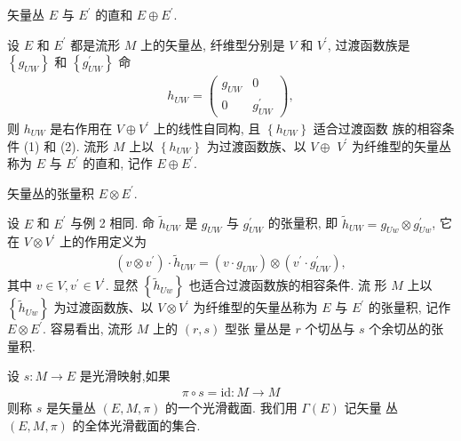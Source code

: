     \begin{example}[][例 2]
        矢量丛 $E$ 与 $E^{\prime}$ 的直和 $E \oplus E^{\prime}$.
    \end{example}
    \begin{solution}
        设 $E$ 和 $E^{\prime}$ 都是流形 $M$ 上的矢量丛, 纤维型分别是 $V$ 和 $V^{\prime}$, 过渡函数族是 $\left\{g_{UW}\right\}$ 和 $\left\{g_{U W}^{\prime}\right\}$ 命
        \begin{align*}
        h_{U W}=\left(\begin{array}{cc}
        g_{U W} & 0 \\
        0 & g_{U W}^{\prime}
        \end{array}\right),
        \end{align*}
        则 $h_{U W}$ 是右作用在 $V \oplus V^{\prime}$ 上的线性自同构, 且 $\left\{h_{U W}\right\}$ 适合过渡函数 族的相容条件 (1) 和 (2). 流形 $M$ 上以 $\left\{h_{U W}\right\}$ 为过渡函数族、以 $V \oplus$ $V^{\prime}$ 为纤维型的矢量丛称为 $E$ 与 $E^{\prime}$ 的直和, 记作 $E \oplus E^{\prime}$.
    \end{solution}

         \begin{example}[][例 3]
            矢量丛的张量积 $E \otimes E^{\prime}$.
         \end{example}
         \begin{solution}
            设 $E$ 和 $E^{\prime}$ 与例 2 相同. 命 $\widetilde{h}_{U W}$ 是 $g_{U W}$ 与 $g_{U W}^{\prime}$ 的张量积, 即 $\widetilde{h}_{U W}=g_{U w} \otimes g_{U w}^{\prime}$, 它在 $V \otimes V^{\prime}$ 上的作用定义为
        \begin{align*}
        \left(v \otimes v^{\prime}\right) \cdot \widetilde{h}_{U W}=\left(v \cdot g_{U W}\right) \otimes\left(v^{\prime} \cdot g_{U W}^{\prime}\right), 
        \end{align*}
        其中 $v \in V, v^{\prime} \in V^{\prime}$. 显然 $\left\{\tilde{h}_{U w}\right\}$ 也适合过渡函数族的相容条件. 流 形 $M$ 上以 $\left\{\widetilde{h}_{U w}\right\}$ 为过渡函数族、以 $V \otimes V^{\prime}$ 为纤维型的矢量丛称为 $E$ 与 $E^{\prime}$ 的张量积, 记作 $E \otimes E^{\prime}$. 容易看出, 流形 $M$ 上的 $(r, s)$ 型张 量丛是 $r$ 个切丛与 $s$ 个余切丛的张量积.
         \end{solution}

        \begin{definition}
            设 $s: M \rightarrow E$ 是光滑映射,如果
        \begin{align*}
        \pi \circ s=\mathrm{id}: M \rightarrow M 
        \end{align*}
        则称 $s$ 是矢量丛 $(E, M, \pi)$ 的一个光滑截面. 我们用 $\Gamma(E)$ 记矢量 丛 $(E, M, \pi)$ 的全体光滑截面的集合.
        \end{definition}




